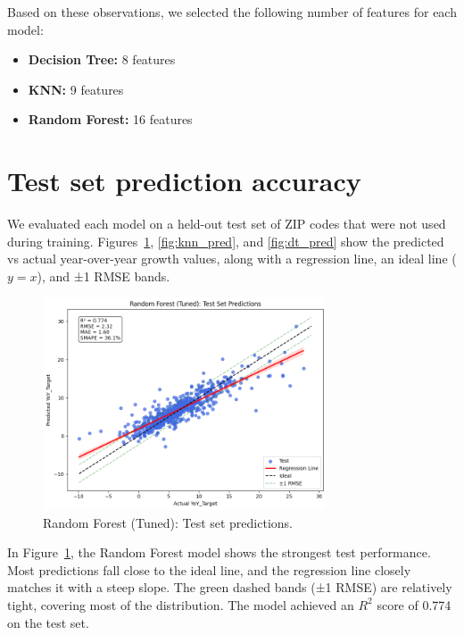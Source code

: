 Based on these observations, we selected the following number of features for each model:
\begin{itemize}
    \item \textbf{Decision Tree:} 8 features
    \item \textbf{KNN:} 9 features
    \item \textbf{Random Forest:} 16 features
\end{itemize}

\section{Test set prediction accuracy}

We evaluated each model on a held-out test set of ZIP codes that were not used during training. Figures~\ref{fig:rf_pred}, \ref{fig:knn_pred}, and \ref{fig:dt_pred} show the predicted vs actual year-over-year growth values, along with a regression line, an ideal line ($y = x$), and ±1 RMSE bands.

\begin{figure}[!ht]
    \centering
    \includegraphics[width=0.75\textwidth]{figures/RF1.png}
    \caption{Random Forest (Tuned): Test set predictions.}
    \label{fig:rf_pred}
\end{figure}
\FloatBarrier

In Figure~\ref{fig:rf_pred}, the Random Forest model shows the strongest test performance. Most predictions fall close to the ideal line, and the regression line closely matches it with a steep slope. The green dashed bands (±1 RMSE) are relatively tight, covering most of the distribution. The model achieved an $R^2$ score of 0.774 on the test set.

